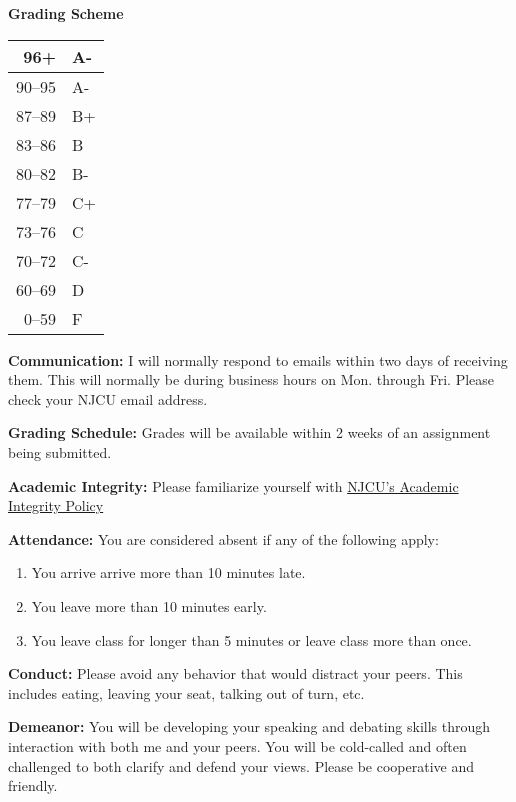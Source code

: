\documentclass[]{article}
\begin{document}
\textbf{Grading Scheme}


\begin{tabular}{|r|l|}
  \hline
  96+ & A- \\ \hline
  90--95 & A- \\ \hline
  87--89 & B+ \\ \hline
  83--86 & B \\ \hline
  80--82 & B- \\ \hline
  77--79 & C+ \\ \hline
  73--76 & C \\ \hline
  70--72 & C- \\ \hline
  60--69 & D \\ \hline
  0--59 & F \\ \hline
  \end{tabular}


\textbf{Communication:} I will normally respond to emails within two
days of receiving them. This will normally be during business hours on
Mon. through Fri. Please check your NJCU email address.

\textbf{Grading Schedule:} Grades will be available within 2 weeks of an
assignment being submitted.

\textbf{Academic Integrity:} Please familiarize yourself with
\href{http://www.njcu.edu/uploadedFiles/About_NJCU/Governance_and_Organization/University_Senate/Policies/Academic\%20INTEGRITY\%20POLICY\%20FINAL\%202-04.pdf}{NJCU's
Academic Integrity Policy}

\textbf{Attendance:} You are considered absent if any of the following
apply:

\begin{enumerate}
\def\labelenumi{\arabic{enumi}.}
\itemsep1pt\parskip0pt
\item
  You arrive arrive more than 10 minutes late.
\item
  You leave more than 10 minutes early.
\item
  You leave class for longer than 5 minutes or leave class more than
  once.
\end{enumerate}

\textbf{Conduct:} Please avoid any behavior that would distract your
peers. This includes eating, leaving your seat, talking out of turn,
etc.

\textbf{Demeanor:} You will be developing your speaking and debating
skills through interaction with both me and your peers. You will be
cold-called and often challenged to both clarify and defend your views.
Please be cooperative and friendly.
\end{document}
